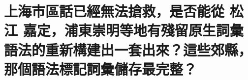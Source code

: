 %

\chapter[上海市區話已經無法搶救，是否能從 松江 嘉定，浦東崇明等地有殘留原生詞彙語法的重新構建出一套出來？這些郊縣，那個語法標記詞彙儲存最完整？]{上海市區話已經無法搶救，是否能從 松江 嘉定，浦東崇明等地有殘留原生詞彙語法的重新構建出一套出來？這些郊縣，那個語法標記詞彙儲存最完整？}

